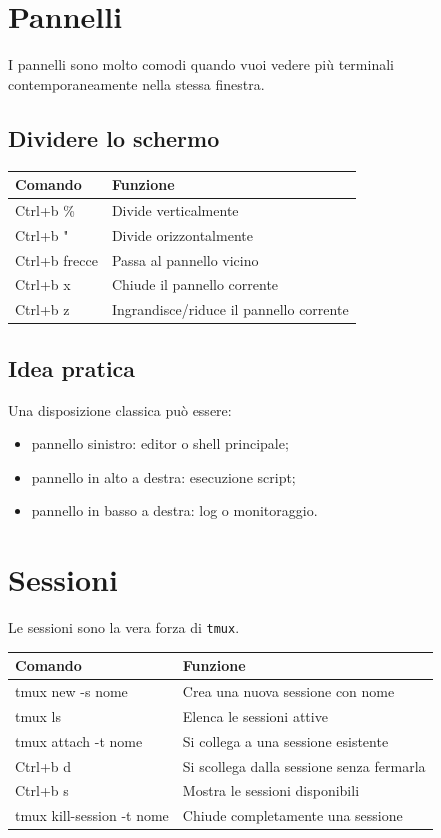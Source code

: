 \documentclass[a4paper,11pt]{article}
\begin{document}
\section{Pannelli}
I pannelli sono molto comodi quando vuoi vedere più terminali contemporaneamente nella stessa finestra.

\subsection{Dividere lo schermo}
\begin{center}
\renewcommand{\arraystretch}{1.3}
\begin{tabularx}{\textwidth}{>{\ttfamily}l X}
\toprule
Comando & Funzione \\
\midrule
Ctrl+b \% & Divide verticalmente \\
Ctrl+b " & Divide orizzontalmente \\
Ctrl+b frecce & Passa al pannello vicino \\
Ctrl+b x & Chiude il pannello corrente \\
Ctrl+b z & Ingrandisce/riduce il pannello corrente \\
\bottomrule
\end{tabularx}
\end{center}

\subsection{Idea pratica}
Una disposizione classica può essere:
\begin{itemize}[leftmargin=1.2cm]
    \item pannello sinistro: editor o shell principale;
    \item pannello in alto a destra: esecuzione script;
    \item pannello in basso a destra: log o monitoraggio.
\end{itemize}

\section{Sessioni}
Le sessioni sono la vera forza di \texttt{tmux}.

\begin{center}
\renewcommand{\arraystretch}{1.3}
\begin{tabularx}{\textwidth}{>{\ttfamily}l X}
\toprule
Comando & Funzione \\
\midrule
tmux new -s nome & Crea una nuova sessione con nome \\
tmux ls & Elenca le sessioni attive \\
tmux attach -t nome & Si collega a una sessione esistente \\
Ctrl+b d & Si scollega dalla sessione senza fermarla \\
Ctrl+b s & Mostra le sessioni disponibili \\
tmux kill-session -t nome & Chiude completamente una sessione \\
\bottomrule
\end{tabularx}
\end{center}
\end{document}

